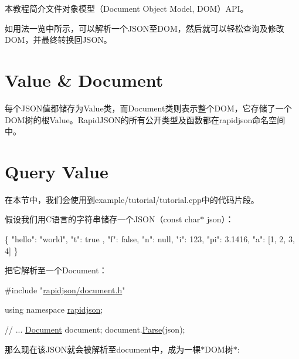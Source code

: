本教程简介文件对象模型（\+Document Object Model, D\+O\+M）\+A\+P\+I。

如用法一览中所示，可以解析一个\+J\+S\+O\+N至\+D\+O\+M，然后就可以轻松查询及修改\+D\+O\+M，并最终转换回\+J\+S\+O\+N。\hypertarget{md_Cadriciel_Commun_Externe_RapidJSON_doc_tutorial.zh-cn_ValueDocument}{}\section{Value \& Document}\label{md_Cadriciel_Commun_Externe_RapidJSON_doc_tutorial.zh-cn_ValueDocument}
每个\+J\+S\+O\+N值都储存为{\ttfamily Value}类，而{\ttfamily Document}类则表示整个\+D\+O\+M，它存储了一个\+D\+O\+M树的根{\ttfamily Value}。\+Rapid\+J\+S\+O\+N的所有公开类型及函数都在{\ttfamily rapidjson}命名空间中。\hypertarget{md_Cadriciel_Commun_Externe_RapidJSON_doc_tutorial.zh-cn_QueryValue}{}\section{Query Value}\label{md_Cadriciel_Commun_Externe_RapidJSON_doc_tutorial.zh-cn_QueryValue}
在本节中，我们会使用到{\ttfamily example/tutorial/tutorial.\+cpp}中的代码片段。

假设我们用\+C语言的字符串储存一个\+J\+S\+O\+N（{\ttfamily const char$\ast$ json}）： 
\begin{DoxyCode}
\{
    \textcolor{stringliteral}{"hello"}: \textcolor{stringliteral}{"world"},
    \textcolor{stringliteral}{"t"}: true ,
    \textcolor{stringliteral}{"f"}: \textcolor{keyword}{false},
    \textcolor{stringliteral}{"n"}: null,
    \textcolor{stringliteral}{"i"}: 123,
    \textcolor{stringliteral}{"pi"}: 3.1416,
    \textcolor{stringliteral}{"a"}: [1, 2, 3, 4]
\}
\end{DoxyCode}


把它解析至一个{\ttfamily Document}： 
\begin{DoxyCode}
\textcolor{preprocessor}{#include "\hyperlink{document_8h}{rapidjson/document.h}"}

\textcolor{keyword}{using namespace }\hyperlink{namespacerapidjson}{rapidjson};

\textcolor{comment}{// ...}
\hyperlink{class_generic_document}{Document} document;
document.\hyperlink{class_generic_document_aebd4e7fddd80c1e1174837aee6d2159b}{Parse}(json);
\end{DoxyCode}


那么现在该\+J\+S\+O\+N就会被解析至{\ttfamily document}中，成为一棵$\ast$\+D\+O\+M树$\ast$\+:




